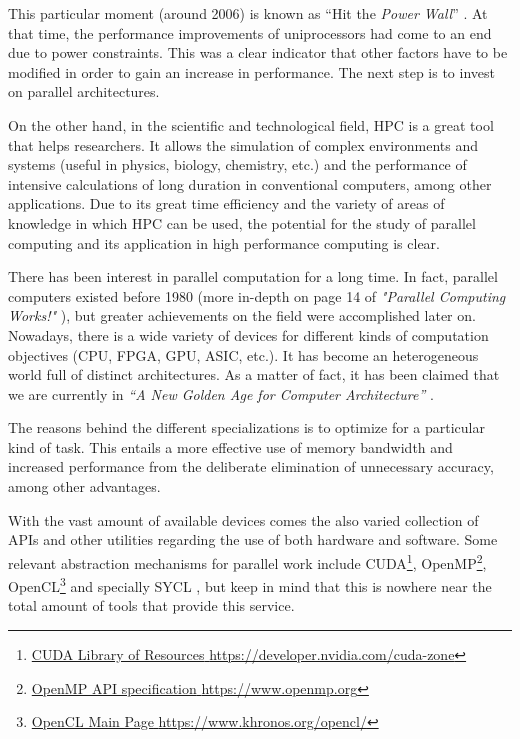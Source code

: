 This particular moment (around 2006) is known as ``Hit the \textit{Power Wall}'' \cite{Bose:2011:Power}.
At that time, the performance improvements of uniprocessors had come to an end due to power constraints.
This was a clear indicator that other factors have to be modified in order to gain an increase in performance. The next step is to invest on parallel architectures.

On the other hand, in the scientific and technological field, HPC is a great tool that helps researchers.
It allows the simulation of complex environments and systems (useful in physics, biology, chemistry, etc.) and the performance of intensive calculations of long duration in conventional computers, among other applications.
Due to its great time efficiency and the variety of areas of knowledge in which HPC can be used, the potential for the study of parallel computing and its application in high performance computing is clear.

There has been interest in parallel computation for a long time.
In fact, parallel computers existed before 1980 (more in-depth on page 14 of \textit{"Parallel Computing Works!"} \cite{Fox:2014:Parallel}), but greater achievements on the field were accomplished later on. Nowadays, there is a wide variety of devices for different kinds of computation objectives (CPU, FPGA, GPU, ASIC, etc.).
It has become an heterogeneous world full of distinct architectures. As a matter of fact, it has been claimed that we are currently in \textit{``A New Golden Age for Computer Architecture''} \cite{Hennessy:2019:New}.

The reasons behind the different specializations is to optimize for a particular kind of task.
This entails a more effective use of memory bandwidth and increased performance from the deliberate elimination of unnecessary accuracy, among other advantages.

With the vast amount of available devices comes the also varied collection of APIs and other utilities regarding the use of both hardware and software.
Some relevant abstraction mechanisms for parallel work include CUDA\footnote{\href{https://developer.nvidia.com/cuda-zone}{{CUDA Library of Resources} \url{https://developer.nvidia.com/cuda-zone}}}, OpenMP\footnote{\href{https://www.openmp.org}{{OpenMP API specification} \url{https://www.openmp.org}}}, OpenCL\footnote{\href{https://www.khronos.org/opencl/}{{OpenCL Main Page} \url{https://www.khronos.org/opencl/}}} and specially SYCL \cite{URL::SYCL}, but keep in mind that this is nowhere near the total amount of tools that provide this service.

